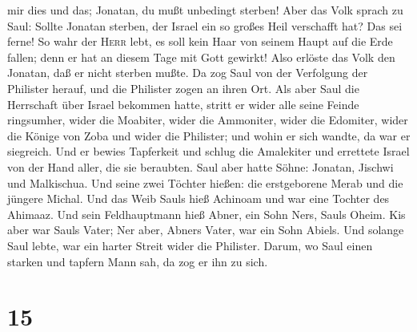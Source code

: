 mir dies und das; Jonatan, du mußt unbedingt sterben! 
Aber das Volk sprach zu Saul: Sollte Jonatan sterben, der Israel ein so
großes Heil verschafft hat? Das sei ferne! So wahr der \textsc{Herr}
lebt, es soll kein Haar von seinem Haupt auf die Erde fallen; denn er
hat an diesem Tage mit Gott gewirkt! Also erlöste das Volk den Jonatan,
daß er nicht sterben mußte.  Da zog Saul von der
Verfolgung der Philister herauf, und die Philister zogen an ihren Ort.
 Als aber Saul die Herrschaft über Israel bekommen hatte,
stritt er wider alle seine Feinde ringsumher, wider die Moabiter, wider
die Ammoniter, wider die Edomiter, wider die Könige von Zoba und wider
die Philister; und wohin er sich wandte, da war er siegreich.
 Und er bewies Tapferkeit und schlug die Amalekiter und
errettete Israel von der Hand aller, die sie beraubten. 
Saul aber hatte Söhne: Jonatan, Jischwi und Malkischua. Und seine zwei
Töchter hießen: die erstgeborene Merab und die jüngere Michal.
 Und das Weib Sauls hieß Achinoam und war eine Tochter
des Ahimaaz. Und sein Feldhauptmann hieß Abner, ein Sohn Ners, Sauls
Oheim.  Kis aber war Sauls Vater; Ner aber, Abners Vater,
war ein Sohn Abiels.  Und solange Saul lebte, war ein
harter Streit wider die Philister. Darum, wo Saul einen starken und
tapfern Mann sah, da zog er ihn zu sich.

\hypertarget{section-14}{%
\section{15}\label{section-14}}

